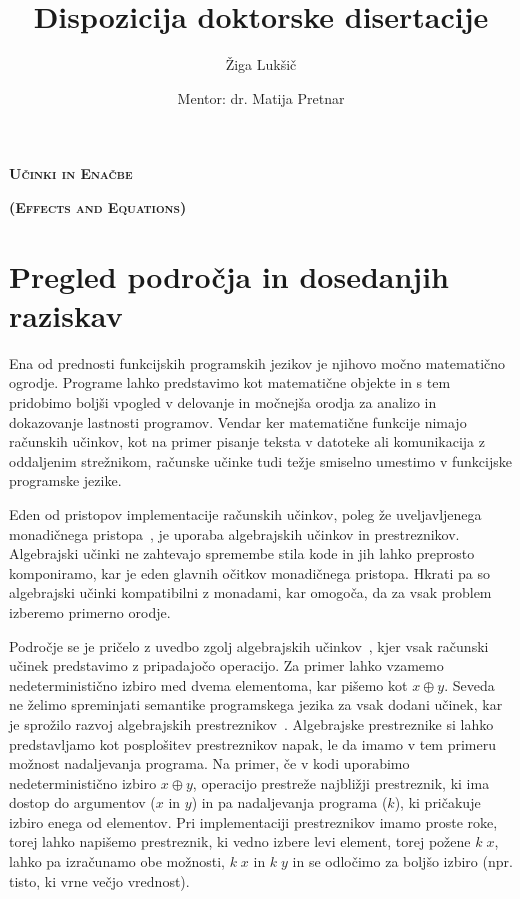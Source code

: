 \documentclass{article}
\title{Dispozicija doktorske disertacije}
\author{Žiga Lukšič \and Mentor: dr. Matija Pretnar}
\date{}
\begin{document}
\maketitle

\vspace{-10mm}
\begin{center}
  \Large{\textsc{\textbf{Učinki in Enačbe}}}

  \Large{\textsc{\textbf{(Effects and Equations)}}}
\end{center}

\section*{Pregled področja in dosedanjih raziskav}

Ena od prednosti funkcijskih programskih jezikov je njihovo močno matematično ogrodje. Programe lahko predstavimo kot matematične objekte in s tem pridobimo boljši vpogled v delovanje in močnejša orodja za analizo in dokazovanje lastnosti programov. Vendar ker matematične funkcije nimajo računskih učinkov, kot na primer pisanje teksta v datoteke ali komunikacija z oddaljenim strežnikom, računske učinke tudi težje smiselno umestimo v funkcijske programske jezike.

Eden od pristopov implementacije računskih učinkov, poleg že uveljavljenega monadičnega pristopa~\cite{DBLP:journals/iandc/Moggi91}, je uporaba algebrajskih učinkov in prestreznikov. Algebrajski učinki ne zahtevajo spremembe stila kode in jih lahko preprosto komponiramo, kar je eden glavnih očitkov monadičnega pristopa. Hkrati pa so algebrajski učinki kompatibilni z monadami, kar omogoča, da za vsak problem izberemo primerno orodje.

Področje se je pričelo z uvedbo zgolj algebrajskih učinkov~\cite{DBLP:conf/fossacs/PlotkinP01, DBLP:journals/acs/PlotkinP03}, kjer vsak računski učinek predstavimo z pripadajočo operacijo. Za primer lahko vzamemo nedeterministično izbiro med dvema elementoma, kar pišemo kot $x \oplus y$. Seveda ne želimo spreminjati semantike programskega jezika za vsak dodani učinek, kar je sprožilo razvoj algebrajskih prestreznikov~\cite{DBLP:phd/ethos/Pretnar10}. Algebrajske prestreznike si lahko predstavljamo kot posplošitev prestreznikov napak, le da imamo v tem primeru možnost nadaljevanja programa. Na primer, če v kodi uporabimo nedeterministično izbiro $x \oplus y$, operacijo prestreže najbližji prestreznik, ki ima dostop do argumentov ($x$ in $y$) in pa nadaljevanja programa ($k$), ki pričakuje izbiro enega od elementov. Pri implementaciji prestreznikov imamo proste roke, torej lahko napišemo prestreznik, ki vedno izbere levi element, torej požene $k\; x$, lahko pa izračunamo obe možnosti, $k\; x$ in $k\; y$ in se odločimo za boljšo izbiro (npr. tisto, ki vrne večjo vrednost). 
\end{document}
